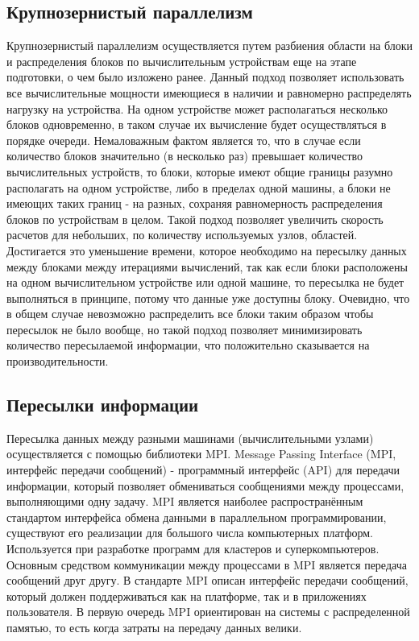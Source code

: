 \documentclass[a4paper, 14pt]{article}
\theoremstyle{definition}
\begin{document}
\newpage
\subsection{Крупнозернистый параллелизм}

\par Крупнозернистый параллелизм осуществляется путем разбиения области на блоки и распределения блоков по вычислительным устройствам еще на этапе подготовки, о чем было изложено ранее. Данный подход позволяет использовать все вычислительные мощности имеющиеся в наличии и равномерно распределять нагрузку на устройства. На одном устройстве может располагаться несколько блоков одновременно, в таком случае их вычисление будет осуществляться в порядке очереди. Немаловажным фактом является то, что в случае если количество блоков значительно (в несколько раз) превышает количество вычислительных устройств, то блоки, которые имеют общие границы разумно располагать на одном устройстве, либо в пределах одной машины, а блоки не имеющих таких границ - на разных, сохраняя равномерность распределения блоков по устройствам в целом. Такой подход позволяет увеличить скорость расчетов для небольших, по количеству используемых узлов, областей. Достигается это уменьшение времени, которое необходимо на пересылку данных между блоками между итерациями вычислений, так как если блоки расположены на одном вычислительном устройстве или одной машине, то пересылка не будет выполняться в принципе, потому что данные уже доступны блоку. Очевидно, что в общем случае невозможно распределить все блоки таким образом чтобы пересылок не было вообще, но такой подход позволяет минимизировать количество пересылаемой информации, что положительно сказывается на производительности.

\newpage
\subsection{Пересылки информации}

\par Пересылка данных между разными машинами (вычислительными узлами) осуществляется с помощью библиотеки MPI. Message Passing Interface (MPI, интерфейс передачи сообщений) - программный интерфейс (API) для передачи информации, который позволяет обмениваться сообщениями между процессами, выполняющими одну задачу. MPI является наиболее распространённым стандартом интерфейса обмена данными в параллельном программировании, существуют его реализации для большого числа компьютерных платформ. Используется при разработке программ для кластеров и суперкомпьютеров. Основным средством коммуникации между процессами в MPI является передача сообщений друг другу. В стандарте MPI описан интерфейс передачи сообщений, который должен поддерживаться как на платформе, так и в приложениях пользователя. В первую очередь MPI ориентирован на системы с распределенной памятью, то есть когда затраты на передачу данных велики.
\end{document}
